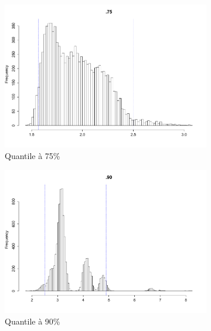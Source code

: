 \documentclass{article}
\renewcommand*{\(}{ \left( }
\renewcommand*{\)}{ \right) }
\begin{document}
\begin{figure}[H]
    \centering
    \begin{subfigure}[t]{0.3\textwidth}
        \includegraphics[width = \linewidth]{img/BootstrapSmooth-75-100.pdf}
        \caption{Quantile à 75\%}
        \label{fig:smoothB75}
    \end{subfigure}%
    \begin{subfigure}[t]{0.3\textwidth}
        \includegraphics[width = \linewidth]{img/BootstrapSmooth-90-100.pdf}
        \caption{Quantile à 90\%}
        \label{fig:smooth90}
    \end{subfigure}%
    \begin{subfigure}[t]{0.3\textwidth}

\end{subfigure}
\end{figure}
\end{document}
